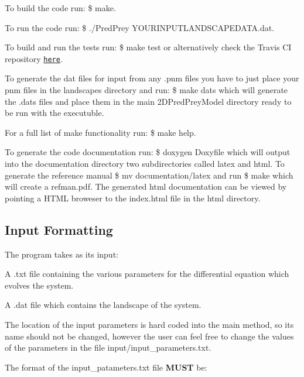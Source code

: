 \begin{DoxyItemize}
\item To build the code run\+: {\ttfamily \$ make}.
\item To run the code run\+: {\ttfamily \$ ./\+Pred\+Prey Y\+O\+U\+R\+I\+N\+P\+U\+T\+L\+A\+N\+D\+S\+C\+A\+P\+E\+D\+A\+T\+A.\+dat}.
\item To build and run the tests run\+: {\ttfamily \$ make test} or alternatively check the Travis CI repository \href{https://travis-ci.org/FranklandJack/2DPredPreyModel}{\tt here}.
\item To generate the dat files for input from any .pnm files you have to just place your pnm files in the landscapes directory and run\+: {\ttfamily \$ make dats} which will generate the .dats files and place them in the main 2\+D\+Pred\+Prey\+Model directory ready to be run with the executuble.
\item For a full list of make functionality run\+: {\ttfamily \$ make help}.
\item To generate the code documentation run\+: {\ttfamily \$ doxygen Doxyfile} which will output into the documentation directory two subdirectories called latex and html. To generate the reference manual {\ttfamily \$ mv documentation/latex} and run {\ttfamily \$ make} which will create a refman.\+pdf. The generated html documentation can be viewed by pointing a H\+T\+ML broweser to the index.\+html file in the html directory.
\end{DoxyItemize}

\subsection*{Input Formatting}

The program takes as its input\+:
\begin{DoxyEnumerate}
\item A .txt file containing the various parameters for the differential equation which evolves the system.
\item A .dat file which contains the landscape of the system.
\end{DoxyEnumerate}

The location of the input parameters is hard coded into the main method, so its name should not be changed, however the user can feel free to change the values of the parameters in the file input/input\+\_\+parameters.\+txt.

The format of the input\+\_\+patameters.\+txt file {\bfseries M\+U\+ST} be\+:


